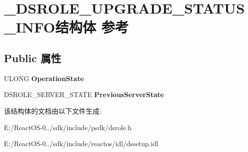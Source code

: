 \hypertarget{struct___d_s_r_o_l_e___u_p_g_r_a_d_e___s_t_a_t_u_s___i_n_f_o}{}\section{\+\_\+\+D\+S\+R\+O\+L\+E\+\_\+\+U\+P\+G\+R\+A\+D\+E\+\_\+\+S\+T\+A\+T\+U\+S\+\_\+\+I\+N\+F\+O结构体 参考}
\label{struct___d_s_r_o_l_e___u_p_g_r_a_d_e___s_t_a_t_u_s___i_n_f_o}
\subsection*{Public 属性}
\begin{DoxyCompactItemize}
\item 
\mbox{\label{struct___d_s_r_o_l_e___u_p_g_r_a_d_e___s_t_a_t_u_s___i_n_f_o_a4817512610398a46d545a1a6629a2531}} 
U\+L\+O\+NG {\bfseries Operation\+State}
\item 
\mbox{\label{struct___d_s_r_o_l_e___u_p_g_r_a_d_e___s_t_a_t_u_s___i_n_f_o_acd70664583473d16b1735315a712d3e5}} 
D\+S\+R\+O\+L\+E\+\_\+\+S\+E\+R\+V\+E\+R\+\_\+\+S\+T\+A\+TE {\bfseries Previous\+Server\+State}
\end{DoxyCompactItemize}


该结构体的文档由以下文件生成\+:\begin{DoxyCompactItemize}
\item 
E\+:/\+React\+O\+S-\/0../sdk/include/psdk/dsrole.\+h\item 
E\+:/\+React\+O\+S-\/0../sdk/include/reactos/idl/dssetup.\+idl\end{DoxyCompactItemize}
